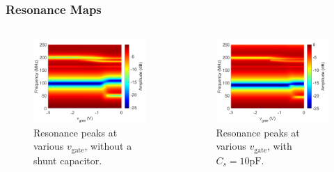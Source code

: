 \documentclass{beamer}
\begin{document}
\begin{frame}
    \frametitle{Resonance Maps}

    \begin{columns}
        \begin{column}{0.5\textwidth}
            \begin{figure}
                \includegraphics[width = 1.1\textwidth]{2102xxrf_001_2021.02.02.17.34.26_final_rf-surf.png}
                \caption{Resonance peaks at various $v_\mathrm{gate}$, without a shunt capacitor.}
            \end{figure}
        \end{column}
        \begin{column}{0.5\textwidth}
            \begin{figure}
                \includegraphics[width = 1.1\textwidth]{210212rf_003_2021.02.12.12.49.25_final_rf.png}
                \caption{Resonance peaks at various $v_\mathrm{gate}$, with $C_s = 10\si{\pico\farad}$.}
            \end{figure}
        \end{column}
    \end{columns}

\end{frame}
\end{document}
